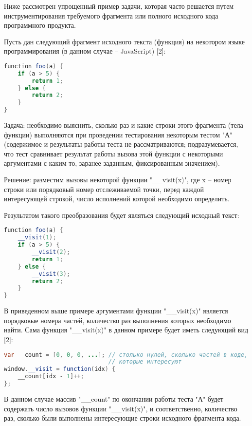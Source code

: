 Ниже рассмотрен упрощенный пример задачи, которая часто решается путем инструментирования требуемого фрагмента или полного исходного кода программного продукта.

Пусть дан следующий фрагмент исходного текста (функция) на некотором языке программирования (в данном случае -- JavaScript) [2]:

\begin{lstlisting}[frame=single, language=Java]
function foo(a) {
    if (a > 5) {
        return 1;
    } else {
        return 2;
    }
}
\end{lstlisting}

Задача: необходимо выяснить, сколько раз и какие строки этого фрагмента (тела функции) выполняются при проведении тестирования некоторым тестом "А" (содержимое и результаты работы теста не рассматриваются; подразумевается, что тест сравнивает результат работы вызова этой функции с некоторыми аргументами с каким-то, заранее заданным, фиксированным значением).

Решение: разместим вызовы некоторой функции "\_\_visit(x)", где x -- номер строки или порядковый номер отслеживаемой точки, перед каждой интересующей строкой, число исполнений которой необходимо определить.

Результатом такого преобразования будет являться следующий исходный текст:

\begin{lstlisting}[frame=single, language=Java]
function foo(a) {
    __visit(1);
    if (a > 5) {
        __visit(2);
        return 1;
    } else {
        __visit(3);
        return 2;
    }
}
\end{lstlisting}

В приведенном выше примере аргументами функции "\_\_visit(x)" является порядковые номера частей, количество раз выполнения которых необходимо найти.
Сама функция "\_\_visit(x)" в данном примере будет иметь следующий вид [2]:

\begin{lstlisting}[frame=single, language=Java]
var __count = [0, 0, 0, ...]; // столько нулей, сколько частей в коде,
                              // которые интересуют
window.__visit = function(idx) {
    __count[idx - 1]++;
};
\end{lstlisting}

В данном случае массив "\_\_count" по окончании работы теста "А" будет содержать число вызовов функции "\_\_visit(x)", и соответственно, количество раз, сколько были выполнены интересующие строки исходного фрагмента кода.

